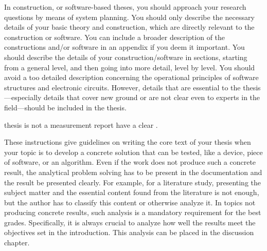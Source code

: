 In construction, or software-based theses, you should approach your research questions by means of system planning. You should only describe the necessary details of your basic theory and construction, which are directly relevant to the construction or software. You can include a broader description of the constructions and/or software in an appendix if you deem it important. You should describe the details of your construction/software in sections, starting from a general level, and then going into more detail, level by level. You should avoid a too detailed description concerning the operational principles of software structures and electronic circuits. However, details that are essential to the thesis---especially details that cover new ground or are not clear even to experts in the field---should be included in the thesis.
\DIFdelbegin %

\DIFdelend \DIFaddbegin {}\DIFaddend thesis is not a measurement report \DIFdelbegin {}\DIFdelend \DIFaddbegin {}\DIFaddend have a clear \DIFdelbegin {}\DIFdelend \DIFaddbegin {}\DIFaddend .

These instructions give guidelines on writing the core text of your thesis when your topic is to develop a concrete solution that can be tested, like a device, piece of software, or an algorithm. Even if the work does not produce such a concrete result, the analytical problem solving has to be present in the documentation and the result be presented clearly. For example, for a literature study, presenting the subject matter and the essential content found from the literature is not enough, but the author has to classify this content or otherwise analyze it. In topics not producing concrete results, such analysis is a mandatory requirement for the best grades. Specifically, it is always crucial to analyze how well the results meet the objectives set in the introduction. This analysis can be placed in the discussion chapter.

